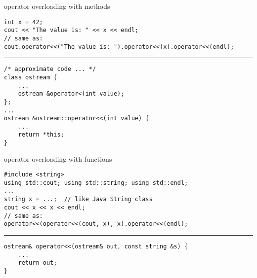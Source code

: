 \begin{frame}[fragile,label=opImplMeth]{operator overloading with methods}
\lstset{language=C++,style=smaller}
\begin{lstlisting}
int x = 42;
cout << "The value is: " << x << endl;
// same as:
cout.operator<<("The value is: ").operator<<(x).operator<<(endl);
\end{lstlisting}
\hrule
\begin{lstlisting}
/* approximate code ... */
class ostream {
    ...
    ostream &operator<(int value);
};
...
ostream &ostream::operator<<(int value) {
    ...
    return *this;
}
\end{lstlisting}
\end{frame}

\begin{frame}[fragile,label=opImplFunc]{operator overloading with functions}
\lstset{language=C++,style=smaller}
\begin{lstlisting}
#include <string>
using std::cout; using std::string; using std::endl;
...
string x = ...;  // like Java String class
cout << x << x << endl;
// same as:
operator<<(operator<<(cout, x), x).operator<<(endl);
\end{lstlisting}
\hrule
\begin{lstlisting}
ostream& operator<<(ostream& out, const string &s) {
    ...
    return out;
}
\end{lstlisting}
\end{frame}
